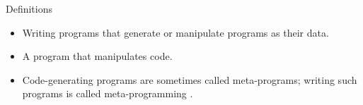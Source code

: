 \begin{frame}{Definitions}
\begin{itemize}
\item Writing programs that generate or manipulate programs as their data.
\item A program that manipulates code.
\item Code-generating programs are sometimes called meta-programs; writing such programs
    is called meta-programming \cite{AbrahamsAndGurtovoy04}.
\end{itemize}
\end{frame}


